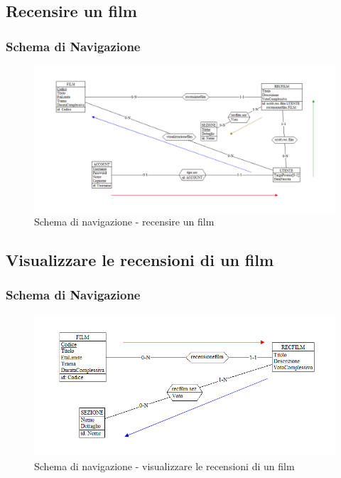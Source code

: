 \documentclass[a4paper,12pt]{report}
\begin{document}
	\subsection{Recensire un film}
	\subsubsection{Schema di Navigazione}
	\begin{figure}[H]
		\centering
		\includegraphics[width=450pt]{ER/navigazione/recensionefilm.png}
		\caption{Schema di navigazione - recensire un film}
	\end{figure}
	\subsection{Visualizzare le recensioni di un film}
	\subsubsection{Schema di Navigazione}
	\begin{figure}[H]
		\centering
		\includegraphics[width=450pt]{ER/navigazione/visualrecensionifilm.png}
		\caption{Schema di navigazione - visualizzare le recensioni di un film}
	\end{figure}
	
\end{document}
